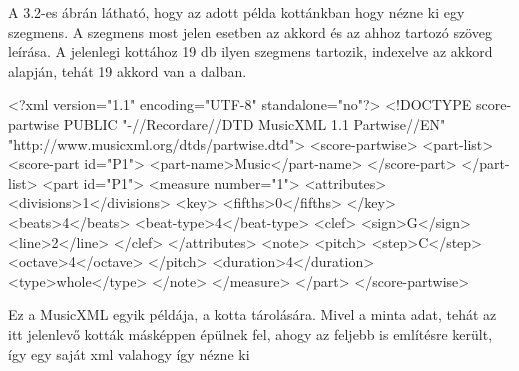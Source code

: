 A 3.2-es ábrán látható, hogy az adott példa kottánkban hogy nézne ki egy szegmens. A szegmens most jelen esetben az akkord és az ahhoz tartozó szöveg leírása. A jelenlegi kottához 19 db ilyen szegmens tartozik, indexelve az akkord alapján, tehát 19 akkord van a dalban. 

\begin{xml}
<?xml version="1.1" encoding="UTF-8" standalone="no"?>
<!DOCTYPE score-partwise PUBLIC
"-//Recordare//DTD MusicXML 1.1 Partwise//EN"
"http://www.musicxml.org/dtds/partwise.dtd">
  <score-partwise>
    <part-list>
      <score-part id="P1">
        <part-name>Music</part-name>
      </score-part>
    </part-list>
    <part id="P1">
      <measure number="1">
        <attributes>
          <divisions>1</divisions>
          <key>
            <fifths>0</fifths>
          </key>
          <beats>4</beats>
          <beat-type>4</beat-type>
          <clef>
            <sign>G</sign>
            <line>2</line>
          </clef>
        </attributes>
        <note>
          <pitch>
            <step>C</step>
            <octave>4</octave>
          </pitch>
          <duration>4</duration>
          <type>whole</type>
        </note>
      </measure>
    </part>
  </score-partwise>
\end{xml}

Ez a MusicXML egyik példája, a kotta tárolására. Mivel a minta adat, tehát az itt jelenlevő kották másképpen épülnek fel, ahogy az feljebb is említésre került, így egy saját xml valahogy így nézne ki

